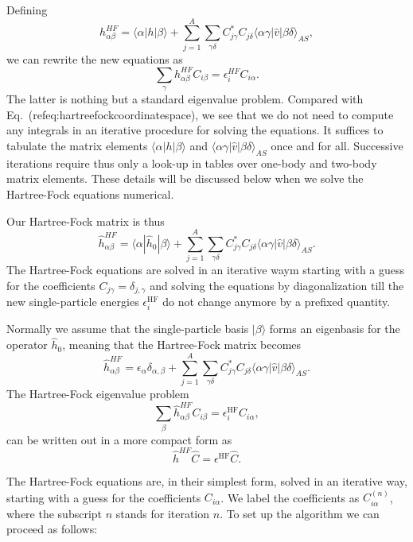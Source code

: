 Defining 
\[
h_{\alpha\beta}^{HF}=\langle \alpha | h | \beta \rangle+
\sum_{j=1}^A\sum_{\gamma\delta} C^*_{j\gamma}C_{j\delta}\langle \alpha\gamma|\hat{v}|\beta\delta\rangle_{AS},
\]
we can rewrite the new equations as 
\begin{equation}
\sum_{\gamma}h_{\alpha\beta}^{HF}C_{i\beta}=\epsilon_i^{HF}C_{i\alpha}. \label{eq:newhf}
\end{equation}
The latter is nothing but a standard eigenvalue problem. Compared with
Eq.~(ref{eq:hartreefockcoordinatespace}), we see that we do not need
to compute any integrals in an iterative procedure for solving the
equations.  It suffices to tabulate the matrix elements
$\langle \alpha | h | \beta \rangle$ and
$\langle \alpha\gamma|\hat{v}|\beta\delta\rangle_{AS}$ once and for
all. Successive iterations require thus only a look-up in tables over
one-body and two-body matrix elements. These details will be discussed
below when we solve the Hartree-Fock equations numerical.


Our Hartree-Fock matrix is thus
\[
\hat{h}_{\alpha\beta}^{HF}=\langle \alpha | \hat{h}_0 | \beta \rangle+
\sum_{j=1}^A\sum_{\gamma\delta} C^*_{j\gamma}C_{j\delta}\langle \alpha\gamma|\hat{v}|\beta\delta\rangle_{AS}.
\]
The Hartree-Fock equations are solved in an iterative waym starting
with a guess for the coefficients $C_{j\gamma}=\delta_{j,\gamma}$ and
solving the equations by diagonalization till the new single-particle
energies $\epsilon_i^{\mathrm{HF}}$ do not change anymore by a
prefixed quantity.




Normally we assume that the single-particle basis $|\beta\rangle$
forms an eigenbasis for the operator $\hat{h}_0$, meaning that the
Hartree-Fock matrix becomes
\[
\hat{h}_{\alpha\beta}^{HF}=\epsilon_{\alpha}\delta_{\alpha,\beta}+
\sum_{j=1}^A\sum_{\gamma\delta} C^*_{j\gamma}C_{j\delta}\langle \alpha\gamma|\hat{v}|\beta\delta\rangle_{AS}.
\]
The Hartree-Fock eigenvalue problem
\[
\sum_{\beta}\hat{h}_{\alpha\beta}^{HF}C_{i\beta}=\epsilon_i^{\mathrm{HF}}C_{i\alpha},
\]
can be written out in a more compact form as
\[
\hat{h}^{HF}\hat{C}=\epsilon^{\mathrm{HF}}\hat{C}. 
\]




The Hartree-Fock equations are, in their simplest form, solved in an
iterative way, starting with a guess for the coefficients
$C_{i\alpha}$. We label the coefficients as $C_{i\alpha}^{(n)}$, where
the subscript $n$ stands for iteration $n$.  To set up the algorithm
we can proceed as follows:

